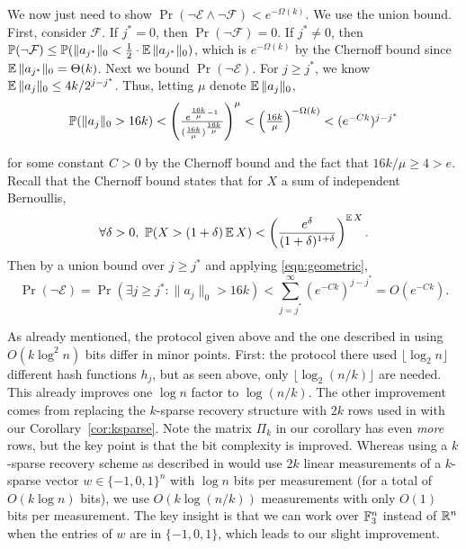 We now just need to show $\Pr(\neg\mathcal{E} \wedge \neg\mathcal{F}) < e^{-\Omega(k)}$. We use the union bound. First, consider $\mathcal{F}$. If $j^* = 0$, then $\Pr(\neg\mathcal{F}) = 0$. If $j^*\neq 0$, then $\operatorname*{\mathbb{P}}(\neg\mathcal{F}) \le \operatorname*{\mathbb{P}}(\|a_{j^*}\|_0 < \frac 12 \cdot\operatorname*{\mathbb{E}}\|a_{j^*}\|_0)$, which is $e^{-\Omega(k)}$ by the Chernoff bound since $\operatorname*{\mathbb{E}}\|a_{j^*}\|_0 = \Theta(k)$. Next we bound $\Pr(\neg \mathcal{E})$. For $j\ge j^*$, we know $\operatorname*{\mathbb{E}}\|a_j\|_0 \le 4k/2^{j-j^*}$. Thus, letting $\mu$ denote $\operatorname*{\mathbb{E}}\|a_j\|_0$, 
\begin{equation}
$$\Pr(\|a_j\|_0 > 16k) < \left(\frac{e^{\frac{16k}{\mu} - 1}}{(\frac{16k}{\mu})^{\frac{16k}{\mu}}}\right)^\mu < \left(\frac{16k}{\mu}\right)^{-\Omega(k)} < (e^{-Ck})^{j-j^*}$$\label{eqn:geometric}
\end{equation}

for some constant $C>0$ by the Chernoff bound and the fact that $16k/\mu \ge 4 > e$. Recall that the Chernoff bound states that for $X$ a sum of independent Bernoullis,
$$
\forall \delta > 0,\ \operatorname*{\mathbb{P}}(X > (1+\delta) \operatorname*{\mathbb{E}} X) < \left(\frac{e^\delta}{(1+\delta)^{1+\delta}}\right)^{\operatorname*{\mathbb{E}} X} .
$$
Then by a union bound over $j\ge j^*$ and applying \eqref{eqn:geometric},
$$
\Pr(\neg \mathcal{E}) = \Pr(\exists j\ge j^*: \|a_j\|_0 > 16k) < \sum_{j=j^*}^\infty (e^{-Ck})^{j-j^*} = O(e^{-Ck}) .
$$

\begin{remark}\label{rem:recov}
\textup{
As already mentioned, the protocol given above and the one described in \cite{JowhariST11} using $O(k\log^2 n)$ bits differ in minor points. First: the protocol there used $\lfloor\log_2 n\rfloor$ different hash functions $h_j$, but as seen above, only $\lfloor \log_2(n/k)\rfloor$ are needed. This already improves one $\log n$ factor to $\log(n/k)$. The other improvement comes from replacing the $k$-sparse recovery structure with $2k$ rows used in \cite{JowhariST11} with our Corollary~\ref{cor:ksparse}. Note the matrix $\Pi_k$ in our corollary has even {\it more} rows, but the key point is that the bit complexity is improved. Whereas using a $k$-sparse recovery scheme as described in \cite{JowhariST11} would use $2k$ linear measurements of a $k$-sparse vector $w\in\{-1,0,1\}^n$ with $\log n$ bits per measurement (for a total of $O(k\log n)$ bits), we use $O(k\log(n/k))$ measurements with only $O(1)$ bits per measurement. The key insight is that we can work over $\mathbb{F}_3^n$ instead of $\mathbb{R}^n$ when the entries of $w$ are in $\{-1,0,1\}$, which leads to our slight improvement.
}
\end{remark}

